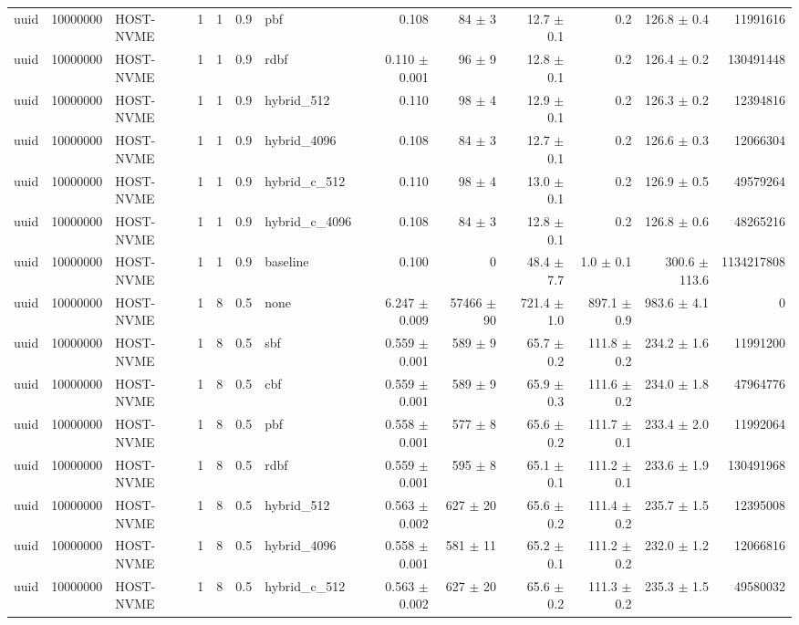 \begin{tabular}{lllllllrrrrrr}
uuid & 10000000 & HOST-NVME & 1 & 1 & 0.9 & pbf & 0.108 & 84 $\pm$ 3 & 12.7 $\pm$ 0.1 & 0.2 & 126.8 $\pm$ 0.4 & 11991616 \\
uuid & 10000000 & HOST-NVME & 1 & 1 & 0.9 & rdbf & 0.110 $\pm$ 0.001 & 96 $\pm$ 9 & 12.8 $\pm$ 0.1 & 0.2 & 126.4 $\pm$ 0.2 & 130491448 \\
uuid & 10000000 & HOST-NVME & 1 & 1 & 0.9 & hybrid\_512 & 0.110 & 98 $\pm$ 4 & 12.9 $\pm$ 0.1 & 0.2 & 126.3 $\pm$ 0.2 & 12394816 \\
uuid & 10000000 & HOST-NVME & 1 & 1 & 0.9 & hybrid\_4096 & 0.108 & 84 $\pm$ 3 & 12.7 $\pm$ 0.1 & 0.2 & 126.6 $\pm$ 0.3 & 12066304 \\
uuid & 10000000 & HOST-NVME & 1 & 1 & 0.9 & hybrid\_c\_512 & 0.110 & 98 $\pm$ 4 & 13.0 $\pm$ 0.1 & 0.2 & 126.9 $\pm$ 0.5 & 49579264 \\
uuid & 10000000 & HOST-NVME & 1 & 1 & 0.9 & hybrid\_c\_4096 & 0.108 & 84 $\pm$ 3 & 12.8 $\pm$ 0.1 & 0.2 & 126.8 $\pm$ 0.6 & 48265216 \\
uuid & 10000000 & HOST-NVME & 1 & 1 & 0.9 & baseline & 0.100 & 0 & 48.4 $\pm$ 7.7 & 1.0 $\pm$ 0.1 & 300.6 $\pm$ 113.6 & 1134217808 \\
uuid & 10000000 & HOST-NVME & 1 & 8 & 0.5 & none & 6.247 $\pm$ 0.009 & 57466 $\pm$ 90 & 721.4 $\pm$ 1.0 & 897.1 $\pm$ 0.9 & 983.6 $\pm$ 4.1 & 0 \\
uuid & 10000000 & HOST-NVME & 1 & 8 & 0.5 & sbf & 0.559 $\pm$ 0.001 & 589 $\pm$ 9 & 65.7 $\pm$ 0.2 & 111.8 $\pm$ 0.2 & 234.2 $\pm$ 1.6 & 11991200 \\
uuid & 10000000 & HOST-NVME & 1 & 8 & 0.5 & cbf & 0.559 $\pm$ 0.001 & 589 $\pm$ 9 & 65.9 $\pm$ 0.3 & 111.6 $\pm$ 0.2 & 234.0 $\pm$ 1.8 & 47964776 \\
uuid & 10000000 & HOST-NVME & 1 & 8 & 0.5 & pbf & 0.558 $\pm$ 0.001 & 577 $\pm$ 8 & 65.6 $\pm$ 0.2 & 111.7 $\pm$ 0.1 & 233.4 $\pm$ 2.0 & 11992064 \\
uuid & 10000000 & HOST-NVME & 1 & 8 & 0.5 & rdbf & 0.559 $\pm$ 0.001 & 595 $\pm$ 8 & 65.1 $\pm$ 0.1 & 111.2 $\pm$ 0.1 & 233.6 $\pm$ 1.9 & 130491968 \\
uuid & 10000000 & HOST-NVME & 1 & 8 & 0.5 & hybrid\_512 & 0.563 $\pm$ 0.002 & 627 $\pm$ 20 & 65.6 $\pm$ 0.2 & 111.4 $\pm$ 0.2 & 235.7 $\pm$ 1.5 & 12395008 \\
uuid & 10000000 & HOST-NVME & 1 & 8 & 0.5 & hybrid\_4096 & 0.558 $\pm$ 0.001 & 581 $\pm$ 11 & 65.2 $\pm$ 0.1 & 111.2 $\pm$ 0.2 & 232.0 $\pm$ 1.2 & 12066816 \\
uuid & 10000000 & HOST-NVME & 1 & 8 & 0.5 & hybrid\_c\_512 & 0.563 $\pm$ 0.002 & 627 $\pm$ 20 & 65.6 $\pm$ 0.2 & 111.3 $\pm$ 0.2 & 235.3 $\pm$ 1.5 & 49580032 \\

\end{tabular}
